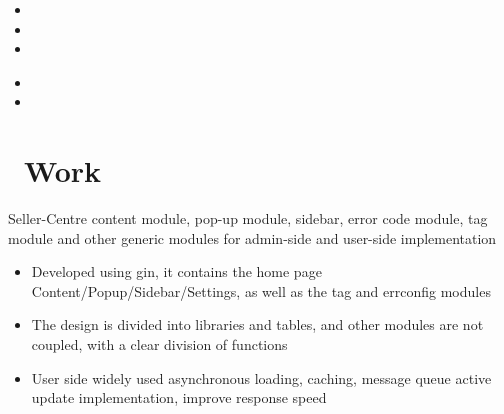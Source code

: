 \documentclass{resume}
\newcommand{\en}[1]{#1}
\newcommand{\zh}[1]{}
\begin{document}
\en{}
\zh{\datedsubsection{\textbf{\href{https://www.sea.com/products/shopee/}{深圳虾皮信息科技发展有限公司}}}{2021/07 -- 至今}}
\en{}
\zh{\role{卖家平台}{后端软件工程师}}
\begin{itemize}[parsep=0.5ex]
      \item \en{}
            \zh{负责 Shopee 卖家主站首页(内容/弹窗/侧边栏等), Seller 通用 Feature Toggle(多地区黑白名单) 等项目(项目 owner)}
      \item \en{}
            \zh{参与内部项目 Python->Go 的重构,参与组内其它需求的开发(内容包括但不限于 otp、oauth、s3、API 网关 等等)}
      \item \en{}
            \zh{工作中能独立按需按时完成需求设计和实现}
\end{itemize}

\en{}
\zh{\role{卖家开放平台(开发者平台)}{后端软件工程师}}
\begin{itemize}[parsep=0.5ex]
      \item \en{}
            \zh{负责内部 PartnerShip 项目(owner,类似 ToB 充值兑换券码平台)}
      \item \en{}
            \zh{负责 OpenAPI 平台的需求开发,负责部分技术优化的开发}
\end{itemize}

\section{\faGithubAlt\ \en{Work}\zh{工作项目}}
\en{Seller-Centre content module, pop-up module, sidebar, error code module, tag module and other generic modules for admin-side and user-side implementation}
\zh{Seller-Centre 首页}
\begin{itemize}
      \item \en{Developed using gin, it contains the home page Content/Popup/Sidebar/Settings, as well as the tag and errconfig modules}
            \zh{项目 owner,使用 gin 开发,包含首页内容、弹窗、侧边栏、错误码、标签等模块}
      \item \en{The design is divided into libraries and tables, and other modules are not coupled, with a clear division of functions}
            \zh{数据上分库分表,设计上功能划分清晰,业务拓展性强}
      \item \en{User side widely used asynchronous loading, caching, message queue active update implementation, improve response speed}
            \zh{广泛使用异步加载、缓存、消息 等方式提高用户体验}
\end{itemize}
\end{document}
